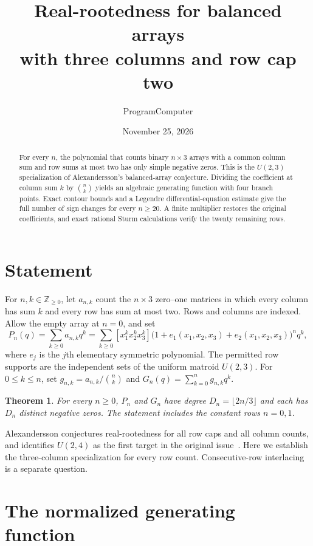\documentclass[11pt]{article}
\title{Real-rootedness for balanced arrays\\ with three columns and row cap two}
\author{ProgramComputer}
\date{November 25, 2026}
\newtheorem{theorem}{Theorem}
\begin{document}
\maketitle

\begin{abstract}
For every \(n\), the polynomial that counts binary \(n\times3\) arrays with a common column sum and row sums at most two has only simple negative zeros. This is the \(U(2,3)\) specialization of Alexandersson's balanced-array conjecture. Dividing the coefficient at column sum \(k\) by \(\binom nk\) yields an algebraic generating function with four branch points. Exact contour bounds and a Legendre differential-equation estimate give the full number of sign changes for every \(n\ge20\). A finite multiplier restores the original coefficients, and exact rational Sturm calculations verify the twenty remaining rows.
\end{abstract}

\section{Statement}

For \(n,k\in\mathbb Z_{\ge0}\), let \(a_{n,k}\) count the \(n\times3\) zero--one matrices in which every column has sum \(k\) and every row has sum at most two. Rows and columns are indexed. Allow the empty array at \(n=0\), and set
\[
P_n(q)=\sum_{k\ge0}a_{n,k}q^k
 =\sum_{k\ge0}[x_1^kx_2^kx_3^k]
 \bigl(1+e_1(x_1,x_2,x_3)+e_2(x_1,x_2,x_3)\bigr)^n q^k,
\]
where \(e_j\) is the \(j\)th elementary symmetric polynomial. The permitted row supports are the independent sets of the uniform matroid \(U(2,3)\). For \(0\le k\le n\), set \(g_{n,k}=a_{n,k}/\binom nk\) and \(G_n(q)=\sum_{k=0}^n g_{n,k}q^k\).

\begin{theorem}\label{thm:main}
For every \(n\ge0\), \(P_n\) and \(G_n\) have degree \(D_n=\lfloor 2n/3\rfloor\) and each has \(D_n\) distinct negative zeros. The statement includes the constant rows \(n=0,1\).
\end{theorem}

Alexandersson conjectures real-rootedness for all row caps and all column counts, and identifies \(U(2,4)\) as the first target in the original issue~\cite{original,catalog}. Here we establish the three-column specialization for every row count. Consecutive-row interlacing is a separate question.

\section{The normalized generating function}\label{sec:generating}
\end{document}
